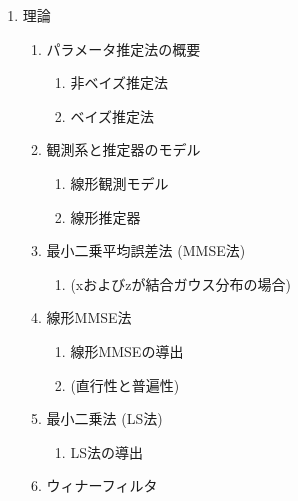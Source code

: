 \documentclass[
]{jsarticle}
\providecommand{\tightlist}{%
  \setlength{\itemsep}{0pt}\setlength{\parskip}{0pt}}
\begin{document}
\begin{enumerate}
\def\labelenumi{\arabic{enumi}.}
\setcounter{enumi}{1}
\tightlist
\item
  理論

  \begin{enumerate}
  \def\labelenumii{\arabic{enumii}.}
  \tightlist
  \item
    パラメータ推定法の概要

    \begin{enumerate}
    \def\labelenumiii{\arabic{enumiii}.}
    \tightlist
    \item
      非ベイズ推定法
    \item
      ベイズ推定法
    \end{enumerate}
  \item
    観測系と推定器のモデル

    \begin{enumerate}
    \def\labelenumiii{\arabic{enumiii}.}
    \tightlist
    \item
      線形観測モデル
    \item
      線形推定器
    \end{enumerate}
  \item
    最小二乗平均誤差法 (MMSE法)

    \begin{enumerate}
    \def\labelenumiii{\arabic{enumiii}.}
    \tightlist
    \item
      (xおよびzが結合ガウス分布の場合)
    \end{enumerate}
  \item
    線形MMSE法

    \begin{enumerate}
    \def\labelenumiii{\arabic{enumiii}.}
    \tightlist
    \item
      線形MMSEの導出
    \item
      (直行性と普遍性)
    \end{enumerate}
  \item
    最小二乗法 (LS法)

    \begin{enumerate}
    \def\labelenumiii{\arabic{enumiii}.}
    \tightlist
    \item
      LS法の導出
    \end{enumerate}
  \item
    ウィナーフィルタ


\end{enumerate}
\end{enumerate}
\end{document}
